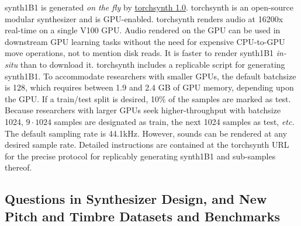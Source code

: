 synth1B1 is generated {\em on the fly} by \href{https://github.com/torchsynth/torchsynth}{torchsynth 1.0}.
torchsynth is an open-source modular synthesizer and is GPU-enabled. torchsynth renders audio at 16200x real-time on a single V100 GPU. Audio rendered on the GPU can be used in downstream GPU learning tasks without the need for expensive CPU-to-GPU move operations, not to mention disk reads. It is faster to render synth1B1 {\em in-situ} than to download it. torchsynth includes a replicable script for generating synth1B1.
To accommodate researchers with smaller GPUs, the default batchsize is 128, which requires between 1.9 and 2.4 GB of GPU memory, depending upon the GPU.
If a train/test split is desired, 10\% of the samples are marked as test. Because researchers with larger GPUs seek higher-throughput with batchsize 1024, $9 \cdot 1024$ samples are designated as train, the next 1024 samples as test, {\em etc.} The default sampling rate is 44.1kHz. However, sounds can be rendered at any desired sample rate. %
Detailed instructions are contained at the torchsynth URL for the precise protocol for replicably generating synth1B1 and sub-samples thereof. %



\subsection{Questions in Synthesizer Design, and New Pitch and Timbre Datasets and Benchmarks}


